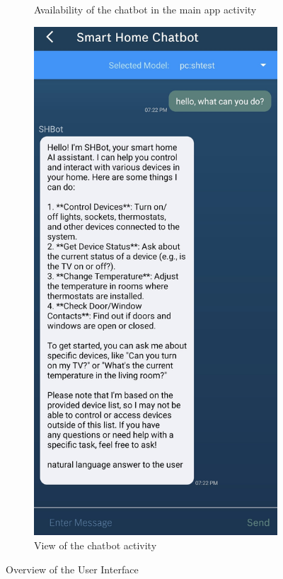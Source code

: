 \begin{figure}[t]
\begin{subfigure}[t]{.44\textwidth}
        \caption{Availability of the chatbot in the main app activity}
        \label{fig:ui-homescreen}
      \end{subfigure} \hfill
      \begin{subfigure}[t]{.44\textwidth}
        \vspace*{0pt}
        \includegraphics[width=\textwidth]{graphics/chatactivity.jpg}
        \caption{View of the chatbot activity}
        \label{fig:ui-chatactivity}
        \end{subfigure}
      \caption{Overview of the User Interface}
      \label{fig:ui-overview}
\end{figure}

